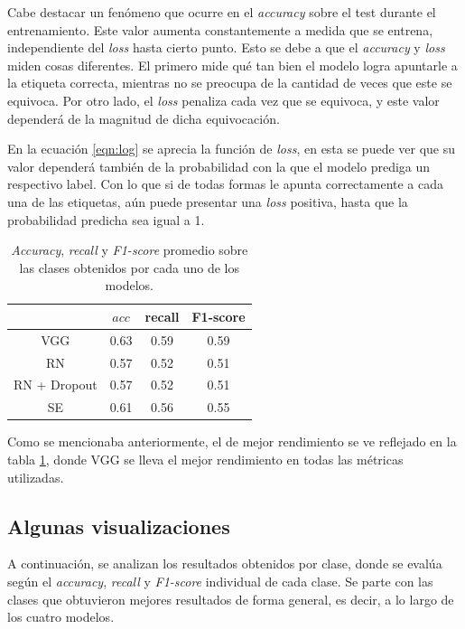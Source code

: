     Cabe destacar un fenómeno que ocurre en el \textit{accuracy} sobre el test durante el entrenamiento. Este valor aumenta constantemente a medida que se entrena, independiente del \textit{loss} hasta cierto punto. Esto se debe a que el \textit{accuracy} y \textit{loss} miden cosas diferentes. El primero mide qué tan bien el modelo logra apuntarle a la etiqueta correcta, mientras no se preocupa de la cantidad de veces que este se equivoca. Por otro lado, el \textit{loss} penaliza cada vez que se equivoca, y este valor dependerá de la magnitud de dicha equivocación.
    
    En la ecuación \ref{eqn:log} se aprecia la función de \textit{loss}, en esta se puede ver que su valor dependerá también de la probabilidad con la que el modelo prediga un respectivo label. Con lo que si de todas formas le apunta correctamente a cada una de las etiquetas, aún puede presentar una \textit{loss} positiva, hasta que la probabilidad predicha sea igual a 1.
    
    \begin{table}[t]
        \centering
        \begin{tabular}{c|ccc}
             & $acc$ & recall & F1-score\\ \hline
            VGG & 0.63 & 0.59 & 0.59 \\
            RN & 0.57 & 0.52 & 0.51 \\
            RN + Dropout & 0.57 & 0.52 & 0.51 \\
            SE & 0.61 & 0.56 & 0.55 \\
        \end{tabular}
        \caption{\textit{Accuracy}, \textit{recall} y \textit{F1-score} promedio sobre las clases obtenidos por cada uno de los modelos.}
        \label{tab:metrics}
    \end{table}
    
    Como se mencionaba anteriormente, el de mejor rendimiento se ve reflejado en la tabla \ref{tab:metrics}, donde VGG se lleva el mejor rendimiento en todas las métricas utilizadas.
    
    \subsection{Algunas visualizaciones}
    
        A continuación, se analizan los resultados obtenidos por clase, donde se evalúa según el \textit{accuracy}, \textit{recall} y \textit{F1-score} individual de cada clase. Se parte con las clases que obtuvieron mejores resultados de forma general, es decir, a lo largo de los cuatro modelos.

